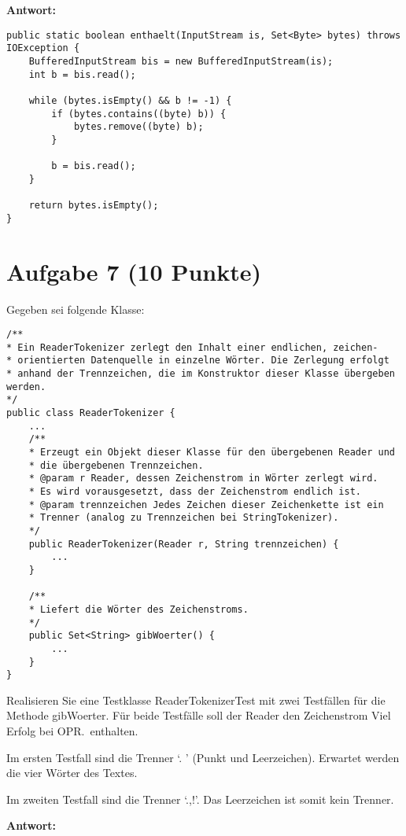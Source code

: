 \textbf{Antwort:}

\begin{lstlisting}
public static boolean enthaelt(InputStream is, Set<Byte> bytes) throws IOException {
    BufferedInputStream bis = new BufferedInputStream(is);    
    int b = bis.read();

    while (bytes.isEmpty() && b != -1) {
        if (bytes.contains((byte) b)) {
            bytes.remove((byte) b);
        }

        b = bis.read();
    }

    return bytes.isEmpty();
}
\end{lstlisting}

\section{Aufgabe 7 (10 Punkte)}

Gegeben sei folgende Klasse:

\begin{lstlisting}
/**
* Ein ReaderTokenizer zerlegt den Inhalt einer endlichen, zeichen-
* orientierten Datenquelle in einzelne Wörter. Die Zerlegung erfolgt
* anhand der Trennzeichen, die im Konstruktor dieser Klasse übergeben werden.
*/
public class ReaderTokenizer {
    ...
    /**
    * Erzeugt ein Objekt dieser Klasse für den übergebenen Reader und
    * die übergebenen Trennzeichen.
    * @param r Reader, dessen Zeichenstrom in Wörter zerlegt wird.
    * Es wird vorausgesetzt, dass der Zeichenstrom endlich ist.
    * @param trennzeichen Jedes Zeichen dieser Zeichenkette ist ein
    * Trenner (analog zu Trennzeichen bei StringTokenizer).
    */
    public ReaderTokenizer(Reader r, String trennzeichen) {
        ...
    }

    /**
    * Liefert die Wörter des Zeichenstroms.
    */
    public Set<String> gibWoerter() {
        ...
    }
}
\end{lstlisting}

Realisieren Sie eine Testklasse ReaderTokenizerTest mit zwei Testfällen für die
Methode gibWoerter. Für beide Testfälle soll der Reader den Zeichenstrom Viel
Erfolg bei OPR.\ enthalten.

Im ersten Testfall sind die Trenner `. ' (Punkt und Leerzeichen). Erwartet
werden die vier Wörter des Textes.

Im zweiten Testfall sind die Trenner `.,!'. Das Leerzeichen ist somit kein
Trenner.

\textbf{Antwort:}


